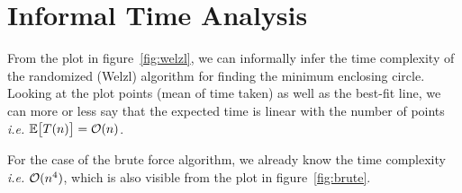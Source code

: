 \documentclass{article}
\begin{document}
\section*{Informal Time Analysis}
\begin{margin}
    
    From the plot in figure~\ref{fig:welzl}, we can informally infer the time complexity of the randomized (Welzl) algorithm for finding the minimum enclosing circle. Looking at the plot points (mean of time taken) as well as the best-fit line, we can more or less say that the expected time is linear with the number of points \textit{i.e.} $\mathbb{E}\big[ T(n) \big] = \mathcal{O}(n)$. \br%

    For the case of the brute force algorithm, we already know the time complexity \textit{i.e.} $\mathcal{O}(n^4)$, which is also visible from the plot in figure~\ref{fig:brute}.

\end{margin}
\end{document}
